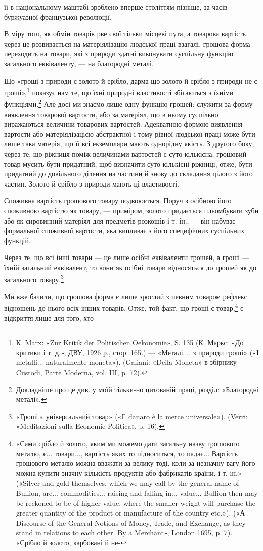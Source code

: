 її в національному маштабі зроблено вперше століттям пізніше,
за часів буржуазної французької революції.

В міру того, як обмін товарів рве свої тільки місцеві пута,
а товарова вартість через це розвивається на матеріялізацію
людської праці взагалі, грошова форма переходить на товари,
які з природи здатні виконувати суспільну функцію загального
еквіваленту, — на благородні металі.

Що «гроші з природи є золото й срібло, дарма що золото й
срібло з природи не є гроші»,\footnote{
К. Marx: «Zur Kritik der Politischen Oekonomie», S. 135 (К. Маркс:
«До критики і т. д.», ДВУ, 1926 р., стор. 165.) — «Металі.... з природи
гроші» («І metalli... naturalmente moneta»). (Galiani: «Deila Moneta»
в збірнику Custodi, Parte Moderna, vol. III, p. 72).
} показує нам те, що їхні природні
властивості збігаються з їхніми функціями.\footnote{
Докладніше про це див. у моїй тільки-но цитованій праці, розділ:
«Благородні металі».
} Але досі
ми знаємо лише одну функцію грошей: служити за форму виявлення
товарової вартости, або за матеріял, що в ньому суспільно
виражаються величини товарових вартостей. Адекватною формою
виявлення вартости або матеріялізацією абстрактної і тому рівної
людської праці може бути лише така матерія, що її всі екземпляри
мають однорідну якість. З другого боку, через те, що ріжниця
поміж величинами вартостей є суто кількісна, грошовий товар
мусить бути придатний, щоб визначити суто кількісні ріжниці,
отже, бути придатний до довільного ділення на частини й знову
до складання цілого з його частин. Золото й срібло з природи
мають ці властивості.

Споживна вартість грошового товару подвоюється. Поруч з
осібною його споживною вартістю як товару, — приміром, золото
придається пльомбувати зуби або як сировинний матеріял
для предметів розкошів і т. ін., — він набуває формальної споживної
вартости, яка випливає з його специфічних суспільних
функцій.

Через те, що всі інші товари — це лише осібні еквіваленти
грошей, а гроші — їхній загальний еквівалент, то вони як осібні
товари відносяться до грошей як до загального товару.\footnote{
«Гроші є універсальний товар» («Il danaro è la merce universale»).
(Verri: «Meditazioni sulla Economie Politica», p. 16).
}

Ми вже бачили, що грошова форма є лише зрослий з певним
товаром рефлекс відношень до нього всіх інших товарів. Отже,
той факт, що гроші є товар,\footnote{
«Сами срібло й золото, яким ми можемо дати загальну назву грошового
металю, є... товари..., вартість яких то підноситься, то падає...
Вартість грошового металю можна вважати за велику тоді, коли за
незначну вагу його можна купити значну кількість продуктів або фабрикатів
 країни, і т. ін.» («Silver and gold themselves, which we may call
by the general name of Bullion, are... commodities... raising and falling
in... value... Bullion then may be reckoned to be of higher value, where
the smaller weight will purchase the greater quantity of the product or
manufacture of the country etc.»). («А Discourse of the General Notions
of Money, Trade, and Exchange, as they stand in relations to each other.
By a Merchant», London 1695, p. 7). «Срібло й золото, карбовані й не-
} є відкриття лише для того, хто